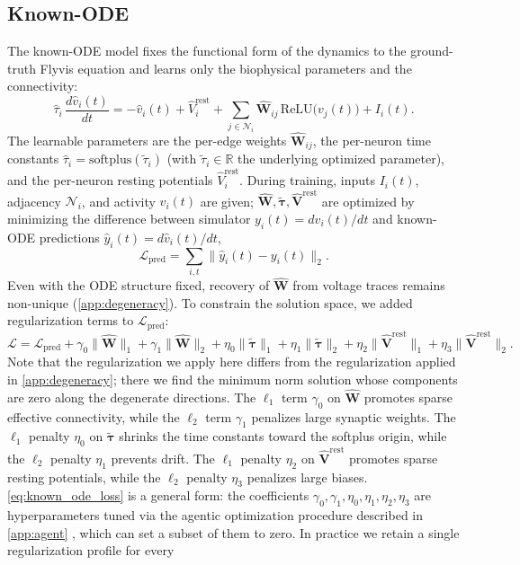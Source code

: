 \documentclass{article}
\begin{document}
\subsection{Known-ODE} \label{app:known_ode}
The known-ODE model fixes the functional form of the dynamics to the ground-truth Flyvis equation and learns only the biophysical parameters and the connectivity:
\begin{equation}
\hat{\tau}_i\,\frac{d\hat{v}_i(t)}{dt}
= -\hat{v}_i(t) + \hat{V}^{\mathrm{rest}}_i
+ \sum_{j\in\mathcal{N}_i} \hat{\mathbf{W}}_{ij}\,\mathrm{ReLU}\!\big(v_j(t)\big)
+ I_i(t).
\label{eq:known_ode}
\end{equation}
The learnable parameters are the per-edge weights $\hat{\mathbf{W}}_{ij}$, the per-neuron time constants $\hat{\tau}_i = \mathrm{softplus}(\tilde{\tau}_i)$ (with $\tilde{\tau}_i\in\mathbb{R}$ the underlying optimized parameter), and the per-neuron resting potentials $\hat{V}^{\mathrm{rest}}_i$. During training, inputs $I_i(t)$, adjacency $\mathcal{N}_i$, and activity $v_i(t)$ are given; $\hat{\mathbf{W}}, \tilde{\boldsymbol{\tau}}, \hat{\mathbf{V}}^{\mathrm{rest}}$ are optimized by minimizing the difference between simulator $y_i(t)=dv_i(t)/dt$ and known-ODE predictions $\hat{y}_i(t)=d\hat{v}_i(t)/dt$,
\begin{equation}
\mathcal{L}_{\mathrm{pred}} = \sum_{i,t}\|\hat{y}_i(t) - y_i(t)\|_2.
\label{eq:known_ode_loss_pred}
\end{equation}
Even with the ODE structure fixed, recovery of $\hat{\mathbf{W}}$ from voltage traces remains non-unique (\cref{app:degeneracy}). To constrain the solution space, we added regularization terms to $\mathcal{L}_{\mathrm{pred}}$:
\begin{equation}
\mathcal{L} = \mathcal{L}_{\mathrm{pred}}
+ \gamma_0\|\hat{\mathbf{W}}\|_1 + \gamma_1\|\hat{\mathbf{W}}\|_2
+ \eta_0\|\tilde{\boldsymbol{\tau}}\|_1 + \eta_1\|\tilde{\boldsymbol{\tau}}\|_2
+ \eta_2\|\hat{\mathbf{V}}^{\mathrm{rest}}\|_1 + \eta_3\|\hat{\mathbf{V}}^{\mathrm{rest}}\|_2.
\label{eq:known_ode_loss}
\end{equation}
Note that the regularization we apply here differs from the regularization applied in \cref{app:degeneracy}; 
there we find the minimum norm solution whose components are zero along the degenerate directions.
The $\ell_1$ term $\gamma_0$ on $\hat{\mathbf{W}}$ promotes sparse effective connectivity, while the $\ell_2$ term $\gamma_1$ penalizes large synaptic weights. The $\ell_1$ penalty $\eta_0$ on $\tilde{\boldsymbol{\tau}}$ shrinks the time constants toward the softplus origin, while the $\ell_2$ penalty $\eta_1$ prevents drift. The $\ell_1$ penalty $\eta_2$ on $\hat{\mathbf{V}}^{\mathrm{rest}}$ promotes sparse resting potentials, while the $\ell_2$ penalty $\eta_3$ penalizes large biases. \cref{eq:known_ode_loss} is a general form: the coefficients $\gamma_0,\gamma_1,\eta_0,\eta_1,\eta_2,\eta_3$ are hyperparameters tuned via the agentic optimization procedure described in \cref{app:agent} , which can set a subset of them to zero. In practice we retain a single regularization profile for every
\end{document}
